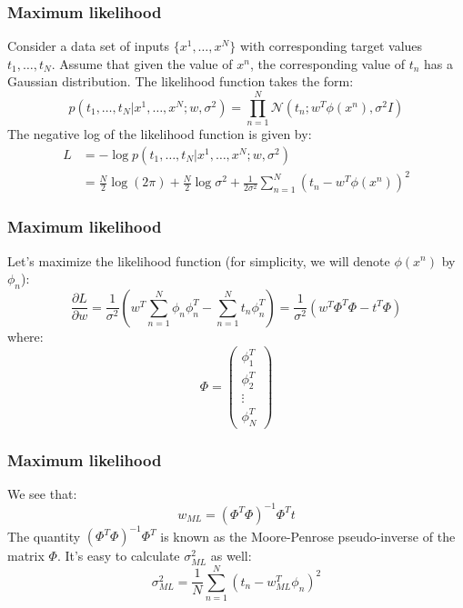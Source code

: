 \documentclass{beamer}
\begin{document}
\begin{frame}
    \frametitle{Maximum likelihood}
    Consider a data set of inputs $\{x^{1},\hdots,x^{N}\}$ with corresponding target values $t_{1},\hdots,t_{N}$. Assume that given the value of $x^{n}$, the corresponding value of $t_{n}$ has a Gaussian distribution. The likelihood function takes the form:
    \begin{equation*}
        p(t_{1},\hdots,t_{N}|x^{1},\hdots,x^{N};w,\sigma^{2})=\prod_{n=1}^{N}\mathcal{N}(t_{n};w^{T}\phi(x^{n}),\sigma^{2}I)
    \end{equation*}
    The negative log of the likelihood function is given by:
    \begin{align*}
        L&=-\log{}p(t_{1},\hdots,t_{N}|x^{1},\hdots,x^{N};w,\sigma^{2}) \\
        &=\frac{N}{2}\log(2\pi)+\frac{N}{2}\log\sigma^{2}+\frac{1}{2\sigma^{2}}\sum_{n=1}^{N}(t_{n}-w^{T}\phi(x^{n}))^{2}
    \end{align*}
\end{frame}

\begin{frame}
    \frametitle{Maximum likelihood}
    Let's maximize the likelihood function (for simplicity, we will denote $\phi(x^{n})$ by $\phi_{n}$):
    \begin{equation*}
        \frac{\partial{}L}{\partial{}w}=\frac{1}{\sigma^{2}}(w^{T}\sum_{n=1}^{N}\phi_{n}\phi_{n}^{T}-\sum_{n=1}^{N}t_{n}\phi_{n}^{T})=\frac{1}{\sigma^{2}}(w^{T}\Phi^{T}\Phi-t^{T}\Phi)
    \end{equation*}
    where:
    \begin{equation*}
        \Phi=\begin{pmatrix}
            \phi_{1}^{T} \\
            \phi_{2}^{T} \\
            \vdots \\
            \phi_{N}^{T}
        \end{pmatrix}
    \end{equation*}
\end{frame}

\begin{frame}
    \frametitle{Maximum likelihood}
    We see that:
    \begin{equation*}
        w_{ML}=(\Phi^{T}\Phi)^{-1}\Phi^{T}t
    \end{equation*}
    The quantity $(\Phi^{T}\Phi)^{-1}\Phi^{T}$ is known as the Moore-Penrose pseudo-inverse of the matrix $\Phi$. It's easy to calculate $\sigma^{2}_{ML}$ as well:
    \begin{equation*}
        \sigma^{2}_{ML}=\frac{1}{N}\sum_{n=1}^{N}(t_{n}-w_{ML}^{T}\phi_{n})^{2}
    \end{equation*}
\end{frame}
\end{document}
